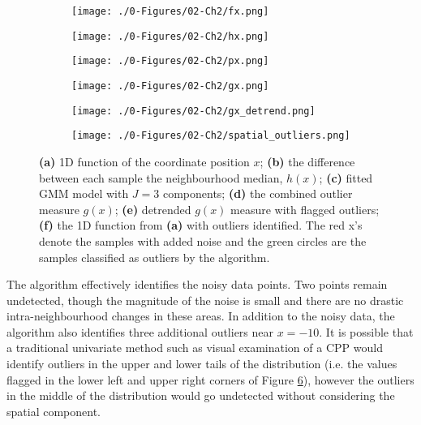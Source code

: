 \begin{figure}[!t]
    \begin{subfigure}{0.5\textwidth}
        \centering
        \texttt{[image: ./0-Figures/02-Ch2/fx.png]}
        \caption{}
        \label{fig:fx}
    \end{subfigure}
    \begin{subfigure}{0.5\textwidth}
        \centering
        \texttt{[image: ./0-Figures/02-Ch2/hx.png]}
        \caption{}
        \label{fig:hx}
    \end{subfigure}
    \begin{subfigure}{0.5\textwidth}
        \centering
        \texttt{[image: ./0-Figures/02-Ch2/px.png]}
        \caption{}
        \label{fig:px}
    \end{subfigure}
    \begin{subfigure}{0.5\textwidth}
        \centering
        \texttt{[image: ./0-Figures/02-Ch2/gx.png]}
        \caption{}
        \label{fig:gx}
    \end{subfigure}
    \begin{subfigure}{0.5\textwidth}
        \centering
        \texttt{[image: ./0-Figures/02-Ch2/gx\_detrend.png]}
        \caption{}
        \label{fig:gx_detrend}
    \end{subfigure}
    \begin{subfigure}{0.5\textwidth}
        \centering
        \texttt{[image: ./0-Figures/02-Ch2/spatial\_outliers.png]}
        \caption{}
        \label{fig:spatial_outliers}
    \end{subfigure}
    \caption{\textbf{(a)} \gls{1D} function of the coordinate position $x$; \textbf{(b)} the difference between each sample the neighbourhood median, $h(x)$; \textbf{(c)} fitted \gls{GMM} model with $J=3$ components; \textbf{(d)} the combined outlier measure $g(x)$; \textbf{(e)} detrended $g(x)$ measure with flagged outliers; \textbf{(f)} the \gls{1D} function from \textbf{(a)} with outliers identified. The red x's denote the samples with added noise and the green circles are the samples classified as outliers by the algorithm.}
    \label{fig:outliers_1d}
\end{figure}

The algorithm effectively identifies the noisy data points. Two points remain undetected, though the magnitude of the noise is small and there are no drastic intra-neighbourhood changes in these areas. In addition to the noisy data, the algorithm also identifies three additional outliers near $x=-10$. It is possible that a traditional univariate method such as visual examination of a \gls{CPP} would identify outliers in the upper and lower tails of the distribution (i.e. the values flagged in the lower left and upper right corners of Figure \ref{fig:spatial_outliers}), however the outliers in the middle of the distribution would go undetected without considering the spatial component.


